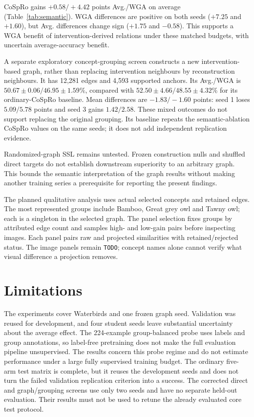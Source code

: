 \documentclass{article}
\newcommand{\TODO}{\texttt{TODO}}
\begin{document}
CoSpRo gains $+0.58/+4.42$ points Avg./WGA on average
(Table~\ref{tab:semantic}). WGA differences are positive on both seeds
($+7.25$ and $+1.60$), but Avg. differences change sign ($+1.75$ and
$-0.58$). This supports a WGA benefit of intervention-derived relations
under these matched budgets, with uncertain average-accuracy benefit.


A separate exploratory concept-grouping screen constructs a new
intervention-based graph, rather than replacing intervention neighbours by
reconstruction neighbours. It has 12,281 edges and 4,593 supported anchors.
Its Avg./WGA is $50.67\pm0.06/46.95\pm1.59\%$, compared with
$52.50\pm4.66/48.55\pm4.32\%$ for its ordinary-CoSpRo baseline.
Mean differences are $-1.83/-1.60$ points: seed 1 loses $5.09/5.78$ points
and seed 3 gains $1.42/2.58$. These mixed outcomes do not support replacing
the original grouping. Its baseline repeats the semantic-ablation CoSpRo
values on the same seeds; it does not add independent replication evidence.

Randomized-graph SSL remains untested. Frozen construction nulls and shuffled
direct targets do not establish downstream superiority to an arbitrary graph.
This bounds the semantic interpretation of the graph results without making
another training series a prerequisite for reporting the present findings.

The planned qualitative analysis uses actual selected concepts and retained edges.
The most represented groups include Bamboo, Great grey owl and Tawny owl;
each is a singleton in the selected graph. The panel selection fixes groups
by attributed edge count and samples high- and low-gain pairs before inspecting
images. Each panel pairs raw and projected similarities with retained/rejected
status. The image panels remain \TODO{}; concept names alone cannot verify
what visual difference a projection removes.

\section{Limitations}
The experiments cover Waterbirds and one frozen graph seed. Validation was
reused for development, and four student seeds leave substantial uncertainty
about the average effect. The 224-example group-balanced probe uses labels and
group annotations, so label-free pretraining does not make the full evaluation
pipeline unsupervised. The results concern this probe regime and do not estimate
performance under a large fully supervised training budget. The ordinary
five-arm test matrix is complete, but it reuses the development seeds and
does not turn the failed validation replication criterion into a success.
The corrected direct and graph/grouping screens use only two seeds and have
no separate held-out evaluation. Their results must not be used to retune
the already evaluated core test protocol.
\end{document}
